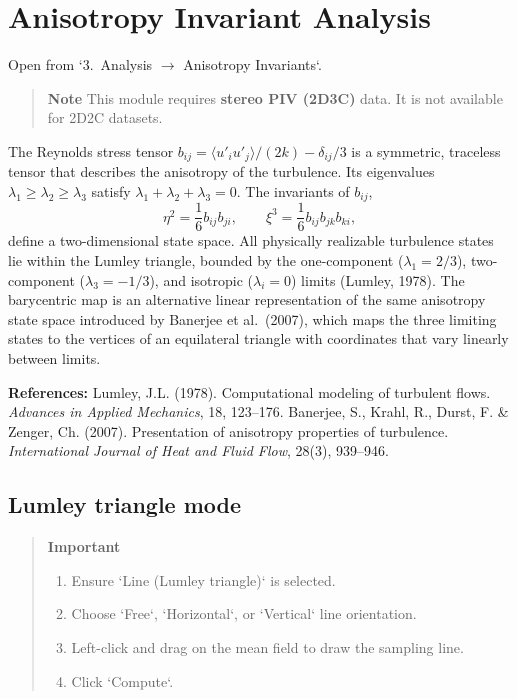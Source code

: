 \section{Anisotropy Invariant Analysis}
\label{ch:anisotropy}

Open from `3.\ Analysis $\to$ Anisotropy Invariants`.

\begin{quote}
\textbf{Note}
This module requires \textbf{stereo PIV (2D3C)} data. It is not available for 2D2C datasets.
\end{quote}

The Reynolds stress tensor $b_{ij} = \langle u'_i u'_j \rangle / (2k) - \delta_{ij}/3$ is a symmetric, traceless tensor that describes the anisotropy of the turbulence. Its eigenvalues $\lambda_1 \geq \lambda_2 \geq \lambda_3$ satisfy $\lambda_1 + \lambda_2 + \lambda_3 = 0$. The invariants of $b_{ij}$,
\[
\eta^2 = \frac{1}{6} b_{ij} b_{ji}, \qquad \xi^3 = \frac{1}{6} b_{ij} b_{jk} b_{ki},
\]
define a two-dimensional state space. All physically realizable turbulence states lie within the Lumley triangle, bounded by the one-component ($\lambda_1 = 2/3$), two-component ($\lambda_3 = -1/3$), and isotropic ($\lambda_i = 0$) limits (Lumley, 1978). The barycentric map is an alternative linear representation of the same anisotropy state space introduced by Banerjee et al.\ (2007), which maps the three limiting states to the vertices of an equilateral triangle with coordinates that vary linearly between limits.

\noindent\textbf{References:} Lumley, J.L. (1978). Computational modeling of turbulent flows. \textit{Advances in Applied Mechanics}, 18, 123--176. Banerjee, S., Krahl, R., Durst, F. \& Zenger, Ch. (2007). Presentation of anisotropy properties of turbulence. \textit{International Journal of Heat and Fluid Flow}, 28(3), 939--946.

\subsection{Lumley triangle mode}

\begin{quote}
\textbf{Important}
\begin{enumerate}[leftmargin=1.5em, topsep=2pt]
  \item Ensure `Line (Lumley triangle)` is selected.
  \item Choose `Free`, `Horizontal`, or `Vertical` line orientation.
  \item Left-click and drag on the mean field to draw the sampling line.
  \item Click `Compute`.
\end{enumerate}
\end{quote}

